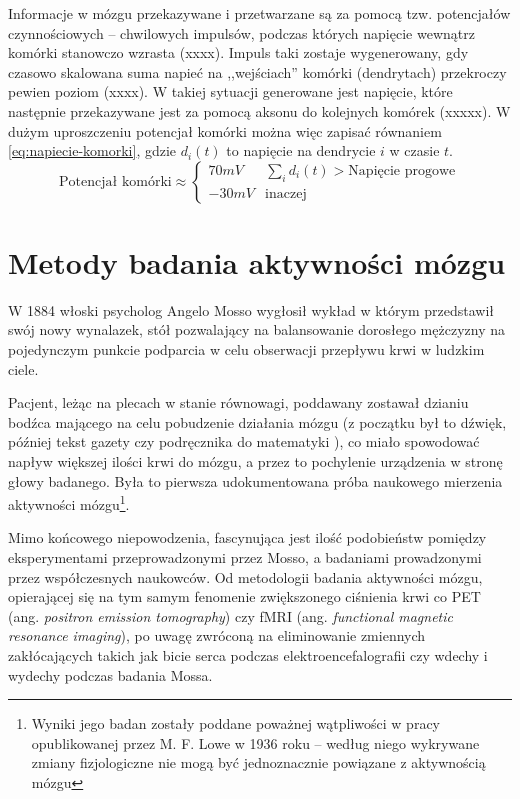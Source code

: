 \documentclass{./assets/wfis}
\begin{document}
Informacje w mózgu przekazywane i przetwarzane są za pomocą tzw. potencjałów czynnościowych – chwilowych impulsów, podczas których napięcie wewnątrz komórki stanowczo wzrasta (xxxx). Impuls taki zostaje wygenerowany, gdy czasowo skalowana suma napieć na ,,wejściach'' komórki (dendrytach) przekroczy pewien poziom (xxxx). W takiej sytuacji generowane jest napięcie, które następnie przekazywane jest za pomocą aksonu do kolejnych komórek (xxxxx). W dużym uproszczeniu potencjał komórki można więc zapisać równaniem \ref{eq:napiecie-komorki}, gdzie $d_i(t)$ to napięcie na dendrycie $i$ w czasie $t$.
\begin{equation}\label{eq:napiecie-komorki}
    \text{Potencjał komórki} \approx 
    \begin{cases} 
      70mV & \sum_i d_i(t) > \text{Napięcie progowe}  \\
      -30mV &  \text{inaczej}
   \end{cases}
\end{equation}


\section{Metody badania aktywności mózgu}
W 1884 włoski psycholog Angelo Mosso wygłosił wykład \cite{sandrone_weighing_2014} w którym przedstawił swój nowy wynalazek, stół pozwalający na balansowanie dorosłego mężczyzny na pojedynczym punkcie podparcia w celu obserwacji przepływu krwi w ludzkim ciele. 

Pacjent, leżąc na plecach w stanie równowagi, poddawany zostawał dzianiu bodźca mającego na celu pobudzenie działania mózgu (z początku był to dźwięk, później tekst gazety czy podręcznika do matematyki \cite{sandrone_weighing_2014}), co miało spowodować napływ większej ilości krwi do mózgu, a przez to pochylenie urządzenia w stronę głowy badanego. Była to pierwsza udokumentowana próba naukowego mierzenia aktywności mózgu\footnote{Wyniki jego badan zostały poddane poważnej wątpliwości w pracy opublikowanej przez M. F. Lowe \cite{lowe_application_1936} w 1936 roku – według niego wykrywane zmiany fizjologiczne nie mogą być jednoznacznie powiązane z aktywnością mózgu}.

Mimo końcowego niepowodzenia, fascynująca jest ilość podobieństw pomiędzy eksperymentami przeprowadzonymi przez Mosso, a badaniami prowadzonymi przez współczesnych naukowców. Od metodologii badania aktywności mózgu, opierającej się na tym samym fenomenie zwiększonego ciśnienia krwi co PET (ang. \textit{positron emission tomography}) czy fMRI (ang. \textit{functional magnetic resonance imaging}), po uwagę zwróconą na eliminowanie zmiennych zakłócających takich jak bicie serca podczas elektroencefalografii czy wdechy i wydechy podczas badania Mossa.
\end{document}

